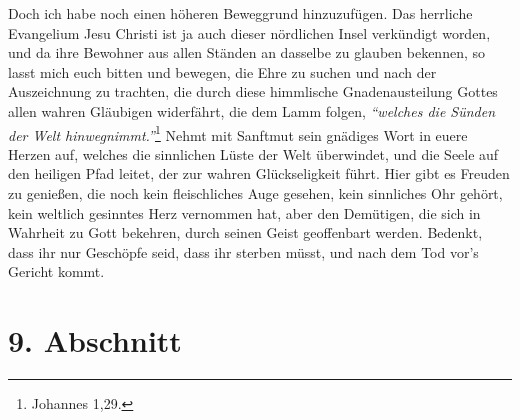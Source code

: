 Doch ich habe noch einen höheren Beweggrund hinzuzufügen. Das herrliche
Evangelium Jesu Christi ist ja auch dieser nördlichen Insel verkündigt
worden, und da ihre Bewohner aus allen Ständen an dasselbe zu glauben bekennen,
so lasst mich euch bitten und bewegen, die Ehre zu suchen und nach der
Auszeichnung zu trachten, die durch diese himmlische
Gnadenausteilung Gottes
allen wahren Gläubigen widerfährt, die dem Lamm folgen,
\textit{"`welches die Sünden
der Welt hinwegnimmt."'}\footnote{Johannes 1,29.}
Nehmt mit Sanftmut sein gnädiges
Wort in euere Herzen auf, welches die sinnlichen Lüste der Welt
überwindet, und
die Seele auf den heiligen Pfad leitet, der zur wahren Glückseligkeit führt.
Hier gibt es Freuden zu genießen, die noch kein fleischliches Auge gesehen,
kein sinnliches Ohr gehört, kein weltlich gesinntes Herz vernommen hat, aber den
Demütigen, die sich in Wahrheit zu Gott bekehren, durch seinen Geist
geoffenbart werden. Bedenkt, dass ihr nur Geschöpfe seid, dass ihr sterben
müsst,
und nach dem Tod vor's Gericht kommt.

\section{9. Abschnitt} \label{kap11_ab9}

